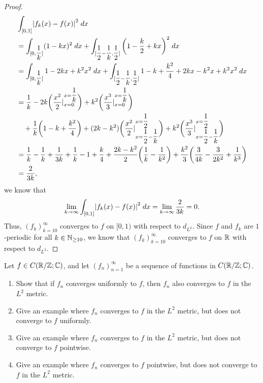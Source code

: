 \begin{proof}
\begin{align*}
     & \int_{[0, 1]} \abs{f_k(x) - f(x)}^2 \; dx                                                                                                                                                                                                    \\
     & = \int_{[0, \dfrac{1}{k}]} (1 - kx)^2 \; dx + \int_{[\dfrac{1}{2} - \dfrac{1}{k}, \dfrac{1}{2}]} \bigg(1 - \dfrac{k}{2} + kx\bigg)^2 \; dx                                                                                                   \\
     & = \int_{[0, \dfrac{1}{k}]} 1 - 2kx + k^2 x^2 \; dx + \int_{[\dfrac{1}{2} - \dfrac{1}{k}, \dfrac{1}{2}]} 1 - k + \dfrac{k^2}{4} + 2kx - k^2 x + k^2 x^2 \; dx                                                                                 \\
     & = \dfrac{1}{k} - 2k \bigg(\dfrac{x^2}{2}|_{x = 0}^{x = \dfrac{1}{k}}\bigg) + k^2 \bigg(\dfrac{x^3}{3}|_{x = 0}^{x = \dfrac{1}{k}}\bigg)                                                                                                      \\
     & \quad + \dfrac{1}{k} \bigg(1 - k + \dfrac{k^2}{4}\bigg) + (2k - k^2) \bigg(\dfrac{x^2}{2}|_{x = \dfrac{1}{2} - \dfrac{1}{k}}^{x = \dfrac{1}{2}}\bigg) + k^2 \bigg(\dfrac{x^3}{3}|_{x = \dfrac{1}{2} - \dfrac{1}{k}}^{x = \dfrac{1}{2}}\bigg) \\
     & = \dfrac{1}{k} - \dfrac{1}{k} + \dfrac{1}{3k} + \dfrac{1}{k} - 1 + \dfrac{k}{4} + \dfrac{2k - k^2}{2} \bigg(\dfrac{1}{k} - \dfrac{1}{k^2}\bigg) + \dfrac{k^2}{3} \bigg(\dfrac{3}{4k} - \dfrac{3}{2k^2} + \dfrac{1}{k^3}\bigg)                \\
     & = \dfrac{2}{3k},
  \end{align*}
  we know that
  \[
    \lim_{k \to \infty} \int_{[0, 1]} \abs{f_k(x) - f(x)}^2 \; dx = \lim_{k \to \infty} \dfrac{2}{3k} = 0.
  \]
  Thus, \((f_k)_{k = 10}^\infty\) converges to \(f\) on \([0, 1)\) with respect to \(d_{L^2}\).
  Since \(f\) and \(f_k\) are \(1\)-periodic for all \(k \in \mathbb{N}_{\geq 10}\), we know that \((f_k)_{k = 10}^\infty\) converges to \(f\) on \(\mathbb{R}\) with respect to \(d_{L^2}\).
\end{proof}

\begin{ex}\label{ii:ex:5.2.6}
  Let \(f \in C(\mathbb{R} / \mathbb{Z} ; \mathbb{C})\), and let \((f_n)_{n = 1}^\infty\) be a sequence of functions in \(C(\mathbb{R} / \mathbb{Z} ; \mathbb{C})\).
  \begin{enumerate}
    \item Show that if \(f_n\) converges uniformly to \(f\), then \(f_n\) also converges to \(f\) in the \(L^2\) metric.
    \item Give an example where \(f_n\) converges to \(f\) in the \(L^2\) metric, but does not converge to \(f\) uniformly.
    \item Give an example where \(f_n\) converges to \(f\) in the \(L^2\) metric, but does not converge to \(f\) pointwise.
    \item Give an example where \(f_n\) converges to \(f\) pointwise, but does not converge to \(f\) in the \(L^2\) metric.
  \end{enumerate}
\end{ex}

